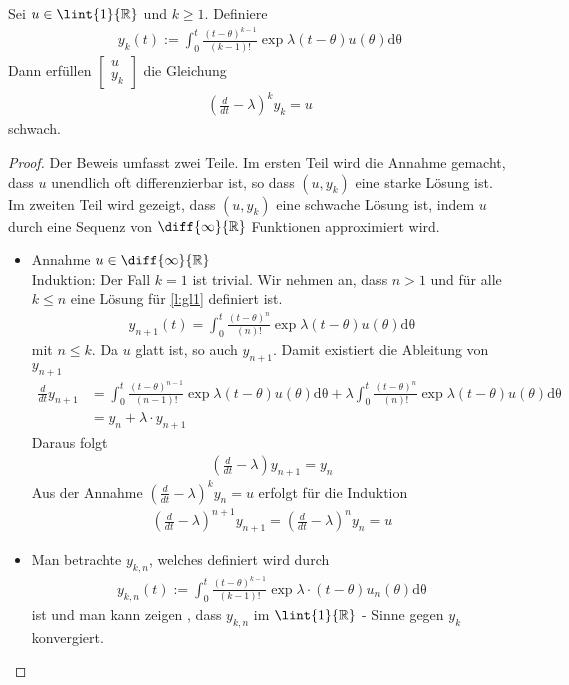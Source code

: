 \begin{lemma}\label{l:H1}
Sei  $u \in \lint{1}{\mathbb{R}}$ und $k \geq 1.$ Definiere 
\begin{align}
	y_k(t):= \int_{0}^t {\frac{(t-\theta)^{k-1}}{(k-1)!}\exp{\lambda (t-\theta)}} u(\theta) \mathrm{d\theta}\label{l:gl1}
\end{align}
Dann erfüllen $\begin{bmatrix}
u \\ 
y_k
\end{bmatrix}$ 
die Gleichung 
\begin{align}
	(\frac{d}{dt	}-\lambda)^k y_k = u 
\end{align}
schwach.
\begin{proof}
	Der Beweis umfasst zwei Teile. Im ersten Teil wird die Annahme gemacht, dass $u$ unendlich oft differenzierbar ist, so dass $(u, y_k)$ eine starke Lösung ist. Im zweiten Teil wird gezeigt, dass $(u, y_k)$ eine schwache Lösung ist, indem $u$ durch eine Sequenz von $\diff{\infty}{\mathbb{R}}$ Funktionen approximiert wird.
	\begin{itemize}
	\item Annahme $u \in \diff{\infty}{\mathbb{R}}$ \\
	Induktion: Der Fall $k=1$ ist trivial. Wir nehmen an, dass $n > 1$ und für alle $k \leq n$ eine Lösung für \ref{l:gl1} definiert ist.   
	\begin{align}
		y_{n+1}(t)= \int_{0}^t {\frac{(t-\theta)^{n}}{(n)!}\exp{\lambda (t-\theta)}} u(\theta) \mathrm{d \theta}
	\end{align} mit $n \leq k$. 
	Da $u$ glatt ist, so auch $y_{n+1}$. Damit existiert die Ableitung von $y_{n+1}$
	\begin{align}
	\frac{d}{dt} y_{n+1} &= \int_{0}^t {\frac{(t-\theta)^{n-1}}{(n-1)!}\exp{\lambda (t-\theta)}} u(\theta)  \mathrm{d \theta} + \lambda\int_{0}^t {\frac{(t-\theta)^{n}}{(n)!}\exp{\lambda (t-\theta)}} u(\theta) \mathrm{d \theta}\\
						&=y_{n} + \lambda \cdot y_{n+1} 
	\end{align}	
	Daraus folgt 
	\begin{align}
		(\frac{d}{dt} -\lambda)y_{n+1} = y_{n}
	\end{align}		
	Aus der Annahme $(\frac{d}{dt} -\lambda)^{k}y_{n} = u$ erfolgt für die Induktion
	\begin{align}
		(\frac{d}{dt} -\lambda)^{n+1}y_{n+1} = (\frac{d}{dt} -\lambda)^{n}y_{n} = u
	\end{align}
	\item Man betrachte $y_{k, n}$, welches definiert wird durch  
	\begin{align}
		y_{k, n}(t) := \int_{0}^t {\frac{(t-\theta)^{k-1}}{(k-1)!}\exp{\lambda\cdot (t-\theta)}} u_n(\theta) \mathrm{d\theta}
	\end{align} ist 
	und man kann zeigen \cite{Polderman1997}, dass $y_{k, n}$ im $\lint{1}{\mathbb{R}}$ - Sinne gegen $y_k$ konvergiert.
	\end{itemize}
\end{proof}
\end{lemma}
